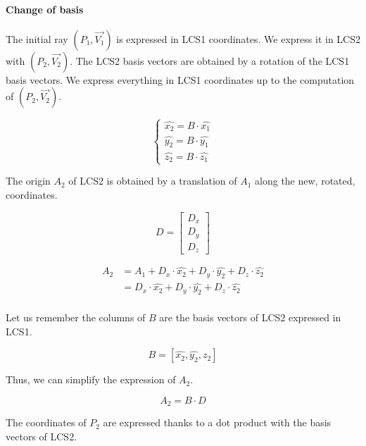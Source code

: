 \paragraph{Change of basis}
The initial ray $(P_1, \overrightarrow{V_1})$ is expressed in LCS1 coordinates.
We express it in LCS2 with $(P_2, \overrightarrow{V_2})$. The LCS2 basis vectors
are obtained by a rotation of the LCS1 basis vectors. We express everything
in LCS1 coordinates up to the computation of $(P_2, \overrightarrow{V_2})$.

\begin{equation} \begin{cases}
\hat{x_2} = B \cdot \hat{x_1} \\
\hat{y_2} = B \cdot \hat{y_1} \\
\hat{z_2} = B \cdot \hat{z_1}
\end{cases} \end{equation}

The origin $A_2$ of LCS2 is obtained by a translation of $A_1$ along
the new, rotated, coordinates.

\begin{equation}
D = \begin{bmatrix} D_x \\ D_y \\ D_z \end{bmatrix}
\end{equation}

\begin{equation} \begin{split}
A_2 &= A_1 + D_x \cdot \hat{x_2} + D_y \cdot \hat{y_2} + D_z \cdot \hat{z_2} \\
    &= D_x \cdot \hat{x_2} + D_y \cdot \hat{y_2} + D_z \cdot \hat{z_2} \\
\end{split} \end{equation}

Let us remember the columns of $B$ are the basis vectors of LCS2 expressed
in LCS1.

\begin{equation}
B = \left[ \hat{x_2}, \hat{y_2}, \hat{z_2} \right]
\end{equation}

Thus, we can simplify the expression of $A_2$.

\begin{equation}
A_2 = B \cdot D
\end{equation}

The coordinates of $P_2$ are expressed thanks to a dot product with the basis
vectors of LCS2.

